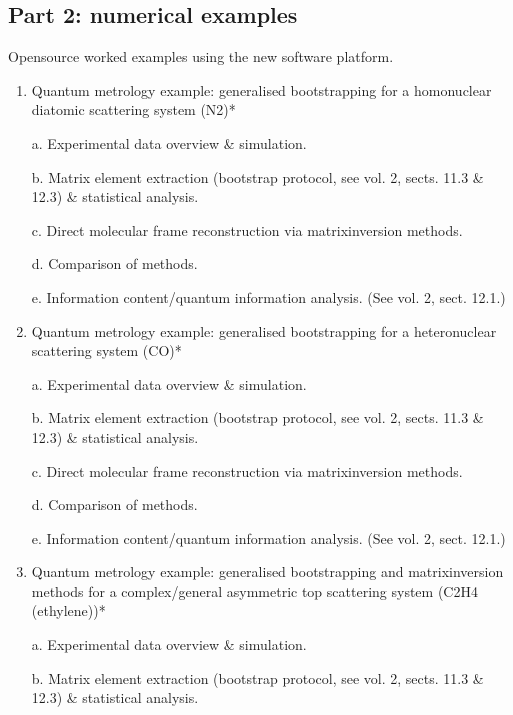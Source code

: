\documentclass[letterpaper,10pt,english]{jupyterBook}
\begin{document}
\subsection{Part 2: numerical examples}
\label{\detokenize{frontmatter/overview_270122:part-2-numerical-examples}}
\sphinxAtStartPar
Open\sphinxhyphen{}source worked examples using the new software platform.
\begin{enumerate}
%
\item {} 
\sphinxAtStartPar
Quantum metrology example: generalised bootstrapping for a homonuclear diatomic scattering system (N2)*

\sphinxAtStartPar
a.  Experimental data overview \& simulation.

\sphinxAtStartPar
b.  Matrix element extraction (bootstrap protocol, see vol. 2, sects. 11.3 \& 12.3) \& statistical analysis.

\sphinxAtStartPar
c.  Direct molecular frame reconstruction via matrix\sphinxhyphen{}inversion methods.

\sphinxAtStartPar
d.  Comparison of methods.

\sphinxAtStartPar
e.  Information content/quantum information analysis. (See vol. 2, sect. 12.1.)

\item {} 
\sphinxAtStartPar
Quantum metrology example: generalised bootstrapping for a heteronuclear scattering system (CO)*

\sphinxAtStartPar
a.  Experimental data overview \& simulation.

\sphinxAtStartPar
b.  Matrix element extraction (bootstrap protocol, see vol. 2, sects. 11.3 \& 12.3) \& statistical analysis.

\sphinxAtStartPar
c.  Direct molecular frame reconstruction via matrix\sphinxhyphen{}inversion methods.

\sphinxAtStartPar
d.  Comparison of methods.

\sphinxAtStartPar
e.  Information content/quantum information analysis. (See vol. 2,
sect. 12.1.)

\item {} 
\sphinxAtStartPar
Quantum metrology example: generalised bootstrapping and
matrix\sphinxhyphen{}inversion methods for a complex/general asymmetric top
scattering system (C2H4 (ethylene))*

\sphinxAtStartPar
a.  Experimental data overview \& simulation.

\sphinxAtStartPar
b.  Matrix element extraction (bootstrap protocol, see vol. 2,
sects. 11.3 \& 12.3) \& statistical analysis.


\end{enumerate}
\end{document}
